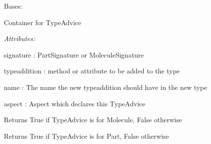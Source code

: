 \documentclass[letterpaper,10pt,english]{sphinxmanual}
\begin{document}
\begin{fulllineitems}
\label{modules/index:aosb.core.TypeAdvice}
Bases: 

Container for TypeAdvice

\begin{DUlineblock}{0em}
\item[] \emph{Attributes:}
\item[]
\begin{DUlineblock}{\DUlineblockindent}
\item[] signature : PartSignature or MoleculeSignature
\item[] typeaddition : method or attribute to be added to the type
\item[] name : The name the new typeaddition should have in the new type
\item[] aspect : Aspect which declares this TypeAdvice
\end{DUlineblock}
\end{DUlineblock}

\begin{fulllineitems}
\label{modules/index:aosb.core.TypeAdvice.isMoleculeAdvice}
Returns True if TypeAdvice is for Molecule, False otherwise

\end{fulllineitems}


\begin{fulllineitems}
\label{modules/index:aosb.core.TypeAdvice.isPartAdvice}
Returns True if TypeAdvice is for Part, False otherwise

\end{fulllineitems}


\end{fulllineitems}

\end{document}
